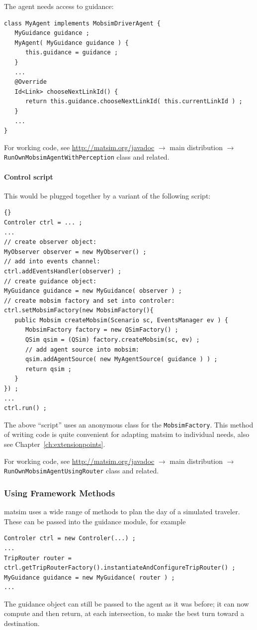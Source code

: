 The agent needs access to guidance:
\begin{lstlisting}
class MyAgent implements MobsimDriverAgent {
   MyGuidance guidance ;
   MyAgent( MyGuidance guidance ) {
      this.guidance = guidance ;
   }  
   ...
   @Override
   Id<Link> chooseNextLinkId() {
      return this.guidance.chooseNextLinkId( this.currentLinkId ) ;
   }
   ...
}
\end{lstlisting}
For working code, see \url{http://matsim.org/javadoc} $\to$ main distribution $\to$ \lstinline{RunOwnMobsimAgentWithPerception} class and related.

\paragraph{Control script}

This would be plugged together by a variant of the following script:
\begin{lstlisting}[basicstyle=\footnotesize\tt]{}
Controler ctrl = ... ;
...
// create observer object:
MyObserver observer = new MyObserver() ;
// add into events channel:
ctrl.addEventsHandler(observer) ;
// create guidance object:
MyGuidance guidance = new MyGuidance( observer ) ;
// create mobsim factory and set into controler:
ctrl.setMobsimFactory(new MobsimFactory(){
   public Mobsim createMobsim(Scenario sc, EventsManager ev ) {
      MobsimFactory factory = new QSimFactory() ; 
      QSim qsim = (QSim) factory.createMobsim(sc, ev) ;
      // add agent source into mobsim:
      qsim.addAgentSource( new MyAgentSource( guidance ) ) ;
      return qsim ;
   }
}) ;
...
ctrl.run() ;
\end{lstlisting}
The above ``script'' uses an anonymous class for the \lstinline$MobsimFactory$. This method of writing code is quite convenient for adapting \gls{matsim} to individual needs, also see Chapter~\ref{ch:extensionpoints}.

For working code, see \url{http://matsim.org/javadoc} $\to$ main distribution $\to$ \lstinline{RunOwnMobsimAgentUsingRouter} class and related.

\subsubsection{Using Framework Methods}
\gls{matsim} uses a wide range of methods to plan the day of a simulated traveler. These can be passed into the guidance module, for example
\begin{lstlisting}
Controler ctrl = new Controler(...) ;
...
TripRouter router = ctrl.getTripRouterFactory().instantiateAndConfigureTripRouter() ;
MyGuidance guidance = new MyGuidance( router ) ;
...
\end{lstlisting}
The guidance object can still be passed to the agent as it was before; it can now compute and then return, at each intersection, to make the best turn toward a destination.

